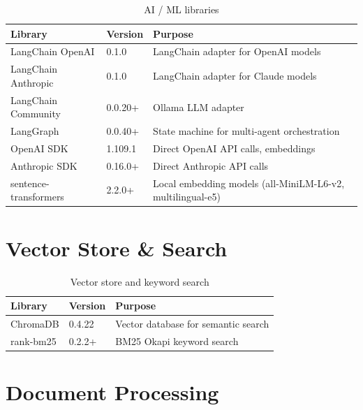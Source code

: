 \documentclass[12pt, a4paper, oneside]{report}
\begin{document}
\begin{table}[H]
\centering
{}
\begin{tabularx}{\linewidth}{llX}
\toprule
\rowcolor{rapidblue!10}
\textbf{Library} & \textbf{Version} & \textbf{Purpose} \\
\midrule
LangChain OpenAI & 0.1.0 & LangChain adapter for OpenAI models \\
LangChain Anthropic & 0.1.0 & LangChain adapter for Claude models \\
LangChain Community & 0.0.20+ & Ollama LLM adapter \\
LangGraph & 0.0.40+ & State machine for multi-agent orchestration \\
OpenAI SDK & 1.109.1 & Direct OpenAI API calls, embeddings \\
Anthropic SDK & 0.16.0+ & Direct Anthropic API calls \\
sentence-transformers & 2.2.0+ & Local embedding models (all-MiniLM-L6-v2, multilingual-e5) \\
\bottomrule
\end{tabularx}
\caption{AI / ML libraries}
\end{table}

\section{Vector Store \& Search}

\begin{table}[H]
\centering
{}
\begin{tabularx}{\linewidth}{llX}
\toprule
\rowcolor{rapidblue!10}
\textbf{Library} & \textbf{Version} & \textbf{Purpose} \\
\midrule
ChromaDB & 0.4.22 & Vector database for semantic search \\
rank-bm25 & 0.2.2+ & BM25 Okapi keyword search \\
\bottomrule
\end{tabularx}
\caption{Vector store and keyword search}
\end{table}

\section{Document Processing}
\end{document}
